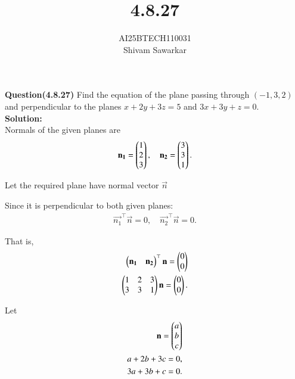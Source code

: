 \documentclass[journal]{IEEEtran}
\begin{document}

\vspace{3cm}

\title{4.8.27}
\author{AI25BTECH110031 \\ Shivam Sawarkar}
 \maketitle
{\let\newpage\relax\maketitle}

\renewcommand{\thefigure}{\theenumi}
\renewcommand{\thetable}{\theenumi}
\setlength{\intextsep}{10pt} %


\renewcommand{\thetable}{\theenumi}

\textbf{Question(4.8.27)} Find the equation of the plane passing through $(-1, 3, 2)$ and perpendicular to the planes $x + 2y + 3z = 5$ and $3x + 3y + z = 0$. \\ 

\textbf{Solution:} \\ 
Normals of the given planes are
\begin{align}
\mathbf{n_1} = \begin{pmatrix}1 \\ 2 \\ 3\end{pmatrix},
\quad
\mathbf{n_2} = \begin{pmatrix}3 \\ 3 \\ 1\end{pmatrix}.
\end{align}

Let the required plane have normal vector $\vec{n}$

Since it is perpendicular to both given planes:
\begin{align}
\vec{n_1}^\top \vec{n} = 0,
\quad
\vec{n_2}^\top \vec{n} = 0.
\end{align}

That is,
\begin{align}
\begin{pmatrix}\mathbf{n_1} & \mathbf{n_2}\end{pmatrix}^\top\mathbf{n}=\begin{pmatrix}0 \\ 0\end{pmatrix} \\ 
\begin{pmatrix}
1 & 2 & 3 \\
3 & 3 & 1
\end{pmatrix}
\mathbf{n}
=
\begin{pmatrix}
0 \\ 0
\end{pmatrix}.
\end{align}

Let
\begin{align}
\mathbf{n} = \begin{pmatrix}a \\ b \\ c\end{pmatrix} \\ 
a + 2b + 3c = 0, \\
3a + 3b + c = 0.
\end{align}
\end{document}
